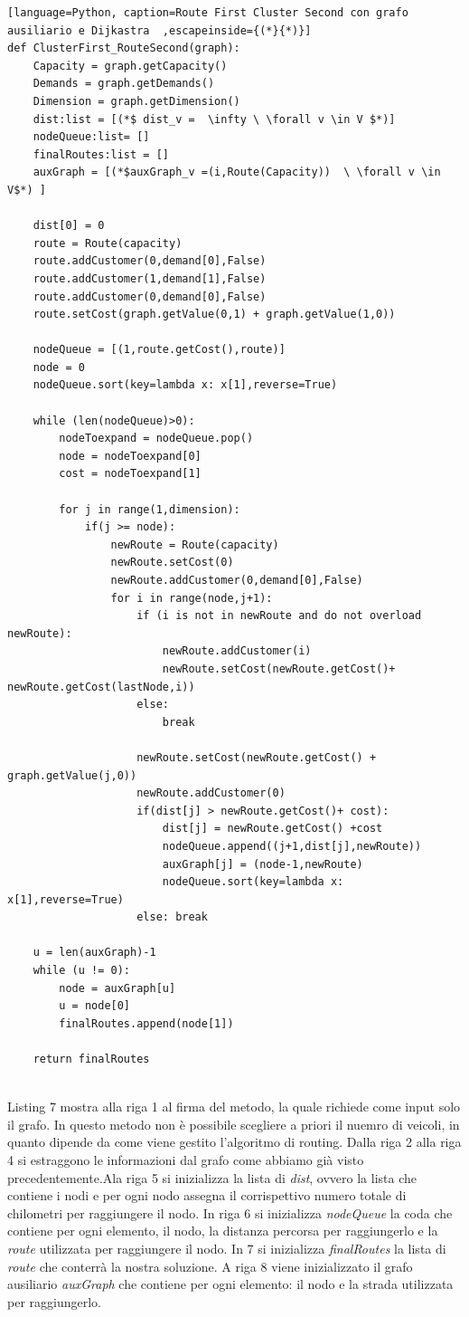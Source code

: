 \documentclass[]{article}
\begin{document}
\begin{lstlisting}[language=Python, caption=Route First Cluster Second con grafo ausiliario e Dijkastra  ,escapeinside={(*}{*)}]
def ClusterFirst_RouteSecond(graph):
	Capacity = graph.getCapacity()
	Demands = graph.getDemands()
	Dimension = graph.getDimension()
	dist:list = [(*$ dist_v =  \infty \ \forall v \in V $*)]
	nodeQueue:list= []
	finalRoutes:list = []
	auxGraph = [(*$auxGraph_v =(i,Route(Capacity))  \ \forall v \in V$*) ]
	
	dist[0] = 0	
	route = Route(capacity)
	route.addCustomer(0,demand[0],False)
	route.addCustomer(1,demand[1],False)
	route.addCustomer(0,demand[0],False)
 	route.setCost(graph.getValue(0,1) + graph.getValue(1,0))
	
	nodeQueue = [(1,route.getCost(),route)]
	node = 0
	nodeQueue.sort(key=lambda x: x[1],reverse=True)
	
	while (len(nodeQueue)>0):
		nodeToexpand = nodeQueue.pop()
		node = nodeToexpand[0]
		cost = nodeToexpand[1]
	
		for j in range(1,dimension):
			if(j >= node):
				newRoute = Route(capacity)
				newRoute.setCost(0)
				newRoute.addCustomer(0,demand[0],False)
				for i in range(node,j+1):
					if (i is not in newRoute and do not overload newRoute):
						newRoute.addCustomer(i)
						newRoute.setCost(newRoute.getCost()+ newRoute.getCost(lastNode,i))
					else:                            
						break
						
					newRoute.setCost(newRoute.getCost() + graph.getValue(j,0))
					newRoute.addCustomer(0)
					if(dist[j] > newRoute.getCost()+ cost):
						dist[j] = newRoute.getCost() +cost
						nodeQueue.append((j+1,dist[j],newRoute))
						auxGraph[j] = (node-1,newRoute)
						nodeQueue.sort(key=lambda x: x[1],reverse=True)
					else: break	
	
	u = len(auxGraph)-1
	while (u != 0):
		node = auxGraph[u]
		u = node[0]
		finalRoutes.append(node[1])
	
	return finalRoutes				
		
\end{lstlisting}
Listing 7 mostra alla riga 1 al firma del metodo, la quale richiede come input solo il grafo. In questo metodo non è possibile scegliere a priori il nuemro di veicoli, in quanto dipende da come viene gestito l'algoritmo di routing. Dalla riga 2 alla riga 4 si estraggono le informazioni dal grafo come abbiamo già visto precedentemente.Ala riga 5 si inizializza la lista di \textit{dist}, ovvero la lista che contiene i nodi e per ogni nodo assegna il corrispettivo numero totale di chilometri per raggiungere il nodo. In riga 6 si inizializza \textit{nodeQueue} la coda che contiene per ogni elemento, il nodo, la distanza percorsa per raggiungerlo e la \emph{route} utilizzata per raggiungere il nodo. In 7 si inizializza \textit{finalRoutes} la lista di \emph{route} che conterrà la nostra soluzione. A riga 8 viene inizializzato il grafo ausiliario \textit{auxGraph} che contiene per ogni elemento: il nodo e la strada utilizzata per raggiungerlo.
\end{document}
